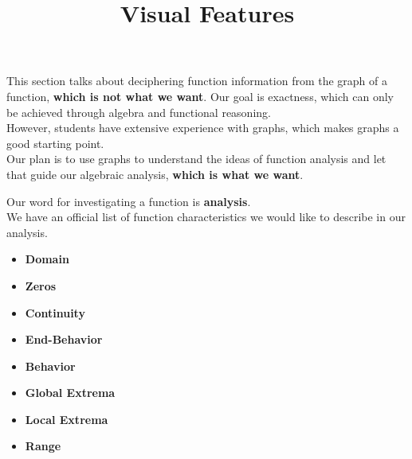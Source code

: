 \documentclass{ximera}
\title{Visual Features}
\begin{document}
\begin{abstract}
\end{abstract}
\maketitle






\begin{warning}


This section talks about deciphering function information from the graph of a function, \textbf{\textcolor{red!80!black}{which is not what we want}}.  Our goal is exactness, which can only be achieved through algebra and functional reasoning.\\

However, students have extensive experience with graphs, which makes graphs a good starting point. \\

Our plan is to use graphs to understand the ideas of function analysis and let that guide our algebraic analysis, \textbf{\textcolor{red!80!black}{which is what we want}}.

\end{warning}





Our word for investigating a function is \textbf{\textcolor{blue!55!black}{analysis}}. \\

We have an official list of function characteristics we would like to describe in our analysis. \\






\begin{itemize}
\item \textbf{\textcolor{blue!55!black}{Domain}}
\item \textbf{\textcolor{blue!55!black}{Zeros}}
\item \textbf{\textcolor{blue!55!black}{Continuity}}
\item \textbf{\textcolor{blue!55!black}{End-Behavior}}
\item \textbf{\textcolor{blue!55!black}{Behavior}}
\item \textbf{\textcolor{blue!55!black}{Global Extrema}}
\item \textbf{\textcolor{blue!55!black}{Local Extrema}}
\item \textbf{\textcolor{blue!55!black}{Range}}
\end{itemize}
\end{document}
